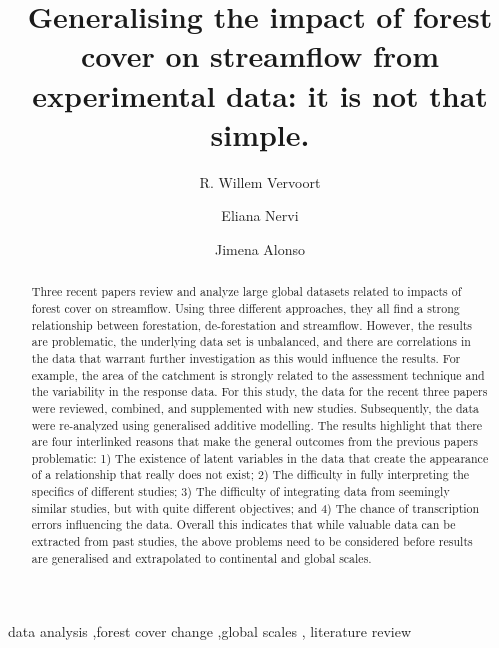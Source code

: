 \documentclass[]{elsarticle} %
\begin{document}
\begin{frontmatter}

  \title{Generalising the impact of forest cover on streamflow from experimental data: it is not that simple.}
    \author[a,b]{R. Willem Vervoort}
    \author[c]{Eliana Nervi}
    \author[d]{Jimena Alonso}
  
  \begin{abstract}
  Three recent papers review and analyze large global datasets related to impacts of forest cover on streamflow. Using three different approaches, they all find a strong relationship between forestation, de-forestation and streamflow. However, the results are problematic, the underlying data set is unbalanced, and there are correlations in the data that warrant further investigation as this would influence the results. For example, the area of the catchment is strongly related to the assessment technique and the variability in the response data. For this study, the data for the recent three papers were reviewed, combined, and supplemented with new studies. Subsequently, the data were re-analyzed using generalised additive modelling.
  The results highlight that there are four interlinked reasons that make the general outcomes from the previous papers problematic: 1) The existence of latent variables in the data that create the appearance of a relationship that really does not exist; 2) The difficulty in fully interpreting the specifics of different studies; 3) The difficulty of integrating data from seemingly similar studies, but with quite different objectives; and 4) The chance of transcription errors influencing the data. Overall this indicates that while valuable data can be extracted from past studies, the above problems need to be considered before results are generalised and extrapolated to continental and global scales.
  \end{abstract}
    \begin{keyword}
    data analysis \sep forest cover change \sep global scales \sep 
    literature review
  \end{keyword}
  
 \end{frontmatter}
\end{document}
